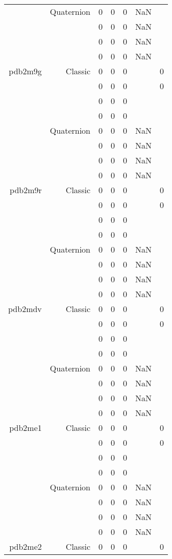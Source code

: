 \begin{xltabular}{\textwidth}{r|rcccSc}
& Quaternion & 0 & 0 & 0 & NaN & \\
& & 0 & 0 & 0 & NaN & \\
& & 0 & 0 & 0 & NaN & \\
& & 0 & 0 & 0 & NaN & \\ \addlinespace
pdb2m9g & Classic & 0 & 0 & 0 & & 0 \\
& & 0 & 0 & 0 & & 0 \\
& & 0 & 0 & 0 & & \\
& & 0 & 0 & 0 & & \\
& Quaternion & 0 & 0 & 0 & NaN & \\
& & 0 & 0 & 0 & NaN & \\
& & 0 & 0 & 0 & NaN & \\
& & 0 & 0 & 0 & NaN & \\ \addlinespace
pdb2m9r & Classic & 0 & 0 & 0 & & 0 \\
& & 0 & 0 & 0 & & 0 \\
& & 0 & 0 & 0 & & \\
& & 0 & 0 & 0 & & \\
& Quaternion & 0 & 0 & 0 & NaN & \\
& & 0 & 0 & 0 & NaN & \\
& & 0 & 0 & 0 & NaN & \\
& & 0 & 0 & 0 & NaN & \\ \addlinespace
pdb2mdv & Classic & 0 & 0 & 0 & & 0 \\
& & 0 & 0 & 0 & & 0 \\
& & 0 & 0 & 0 & & \\
& & 0 & 0 & 0 & & \\
& Quaternion & 0 & 0 & 0 & NaN & \\
& & 0 & 0 & 0 & NaN & \\
& & 0 & 0 & 0 & NaN & \\
& & 0 & 0 & 0 & NaN & \\ \addlinespace
pdb2me1 & Classic & 0 & 0 & 0 & & 0 \\
& & 0 & 0 & 0 & & 0 \\
& & 0 & 0 & 0 & & \\
& & 0 & 0 & 0 & & \\
& Quaternion & 0 & 0 & 0 & NaN & \\
& & 0 & 0 & 0 & NaN & \\
& & 0 & 0 & 0 & NaN & \\
& & 0 & 0 & 0 & NaN & \\ \addlinespace
pdb2me2 & Classic & 0 & 0 & 0 & & 0 \\

\end{xltabular}
